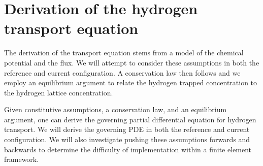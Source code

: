 \documentclass[10pt]{elsarticle}
\begin{document}
\section{Derivation of the hydrogen transport equation}
The derivation of the transport equation stems from a model of the chemical potential and the flux. We will attempt to consider these assumptions in both the reference and current configuration. A conservation law then follows and we employ an equilibrium argument to relate the hydrogen trapped concentration to the hydrogen lattice concentration.

Given constitutive assumptions, a conservation law, and an equilibrium argument, one can derive the governing partial differential equation for hydrogen transport. We will derive the governing PDE in both the reference and current configuration. We will also investigate pushing these assumptions forwards and backwards to determine the difficulty of implementation within a finite element framework.
\end{document}

